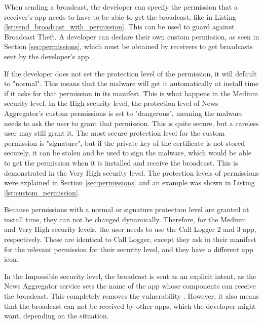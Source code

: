     When sending a broadcast, the developer can specify the permission that a receiver's app needs to have to be able to get the broadcast, like in Listing \ref{lst:send_broadcast_with_permission}. This can be used to guard against Broadcast Theft. A developer can declare their own custom permission, as seen in Section \ref{sec:permissions}, which must be obtained by receivers to get broadcasts sent by the developer's app. 
    
    
    
    If the developer does not set the protection level of the permission, it will default to "normal". This means that the malware will get it automatically at install time if it asks for that permission in its manifest. This is what happens in the Medium security level. In the High security level, the protection level of News Aggregator's custom permissions is set to "dangerous", meaning the malware needs to ask the user to grant that permission. This is quite secure, but a careless user may still grant it. The most secure protection level for the custom permission is "signature", but if the private key of the certificate is not stored securely, it can be stolen and be used to sign the malware, which would be able to get the permission when it is installed and receive the broadcast. This is demonstrated in the Very High security level. The protection levels of permissions were explained in Section \ref{sec:permissions} and an example was shown in Listing \ref{lst:custom_permission}.
    
    Because permissions with a normal or signature protection level are granted at install time, they can not be changed dynamically. Therefore, for the Medium and Very High security levels, the user needs to use the Call Logger 2 and 3 app, respectively. These are identical to Call Logger, except they ask in their manifest for the relevant permission for their security level, and they have a different app icon.
    
    In the Impossible security level, the broadcast is sent as an explicit intent, as the News Aggregator service sets the name of the app whose components can receive the broadcast. This completely removes the vulnerability \cite{2010_icc_paper}. However, it also means that the broadcast can not be received by other apps, which the developer might want, depending on the situation.
    

